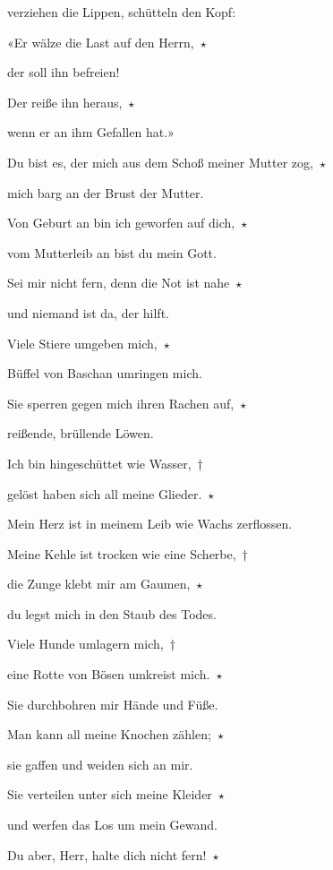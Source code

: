 verziehen die Lippen, schütteln den Kopf:
 
\noindent «Er wälze die Last auf den Herrn,~$\star$~\nopagebreak

der soll ihn befreien! 
 
\noindent Der reiße ihn heraus,~$\star$~\nopagebreak

wenn er an ihm Gefallen hat.»
 
\noindent Du bist es, der mich aus dem Schoß meiner Mutter zog,~$\star$~\nopagebreak

mich barg an der Brust der Mutter.
 
\noindent Von Geburt an bin ich geworfen auf dich,~$\star$~\nopagebreak

vom Mutterleib an bist du mein Gott.
 
\noindent Sei mir nicht fern, denn die Not ist nahe~$\star$~\nopagebreak

und niemand ist da, der hilft.
 
\noindent Viele Stiere umgeben mich,~$\star$~\nopagebreak

Büffel von Baschan umringen mich.
 
\noindent Sie sperren gegen mich ihren Rachen auf,~$\star$~\nopagebreak

reißende, brüllende Löwen.
 
\noindent Ich bin hingeschüttet wie Wasser,~†~\nopagebreak

gelöst haben sich all meine Glieder.~$\star$~\nopagebreak

Mein Herz ist in meinem Leib wie Wachs zerflossen.
 
\noindent Meine Kehle ist trocken wie eine Scherbe,~†~\nopagebreak

die Zunge klebt mir am Gaumen,~$\star$~\nopagebreak

du legst mich in den Staub des Todes.
 
\noindent Viele Hunde umlagern mich,~†~\nopagebreak

eine Rotte von Bösen umkreist mich.~$\star$~\nopagebreak

Sie durchbohren mir Hände und Füße.
 
\noindent Man kann all meine Knochen zählen;~$\star$~\nopagebreak

sie gaffen und weiden sich an mir.
 
\noindent Sie verteilen unter sich meine Kleider~$\star$~\nopagebreak

und werfen das Los um mein Gewand.
 
\noindent Du aber, Herr, halte dich nicht fern!~$\star$~\nopagebreak

